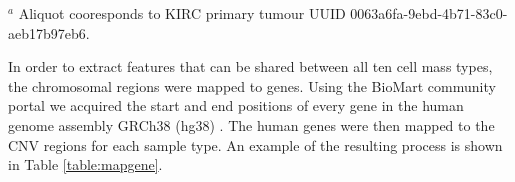 \begin{table}[ht]
\caption{Raw CNV Data from Genome Wide SNP Segmentation} %
\centering %
\raggedright
\footnotesize{$^a$ Aliquot cooresponds to KIRC primary tumour UUID 0063a6fa-9ebd-4b71-83c0-aeb17b97eb6.}

\label{table:rawcnv}
\end{table}


\noindent
In order to extract features that can be shared between all ten cell mass types, the chromosomal regions were mapped to genes. Using the BioMart community portal we acquired the start and end positions of every gene in the human genome assembly GRCh38 (hg38) \cite{smedley2015biomart}. The human genes were then mapped to the CNV regions for each sample type. An example of the resulting process is shown in Table \ref{table:mapgene}.

